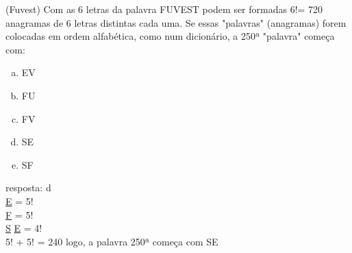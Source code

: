 \begin{ex}
 (Fuvest) Com as 6 letras da palavra FUVEST podem ser formadas 6!= 720 anagramas de 6 letras distintas cada uma. Se essas "palavras" (anagramas) forem colocadas em ordem alfabética, como num dicionário, a 250ª "palavra" começa com:
    \begin{enumerate}[(a)]
    \item EV
    \item FU
    \item FV 
    \item SE
    \item SF
    \end{enumerate}
     \begin{sol}
      resposta: d  \\
     \underline{E} \underline{\phantom{A}} \underline{\phantom{A}}  \underline{\phantom{A}} \underline{\phantom{A}} \underline{\phantom{A}} = 5!\\
     \underline{F}  \underline{\phantom{A}} \underline{\phantom{A}} \underline{\phantom{A}} \underline{\phantom{A}} \underline{\phantom{A}} = 5! \\
     \underline{S} \underline{E} \underline{\phantom{A}} \underline{\phantom{A}}   \underline{\phantom{A}} \underline{\phantom{A}}= 4!  \\
     5! + 5! = 240 logo, a palavra 250ª começa com SE
     \end{sol}
\end{ex}